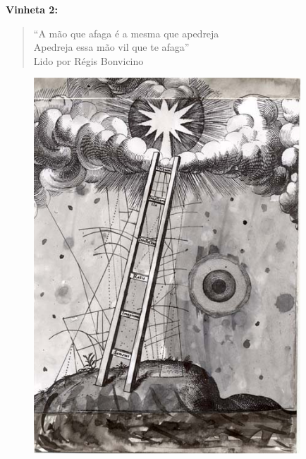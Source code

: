 \begin{absolutelynopagebreak}
\textbf{Vinheta 2:}


\begin{verse}
``A mão que afaga é a mesma que apedreja\\
Apedreja essa mão vil que te afaga''\\[5pt]
Lido por Régis Bonvicino
\end{verse}

\thispagestyle{empty}

\begin{vplace}
\begin{figure}[H]
  \centering
  \vspace*{2cm}
  \includegraphics[width=100mm]{./imgs/caparc2.JPG}  

\end{figure}
\end{vplace}

\end{absolutelynopagebreak}

